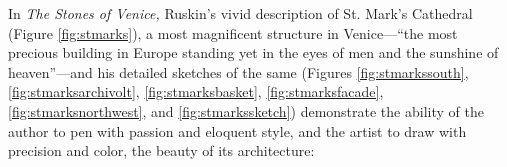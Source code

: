 In \textit{The Stones of Venice,} Ruskin’s vivid description of St.
Mark’s Cathedral (Figure \ref{fig:stmarks}), a most magnificent structure in Venice---“the
most precious building in Europe standing yet in the eyes of men and
the sunshine of heaven”\citep{nyt1880}---and his detailed sketches of the
same (Figures \ref{fig:stmarkssouth}, \ref{fig:stmarksarchivolt}, \ref{fig:stmarksbasket}, \ref{fig:stmarksfacade}, \ref{fig:stmarksnorthwest}, and \ref{fig:stmarkssketch}) demonstrate the ability of the author to pen with
passion and eloquent style, and the artist to draw with precision and
color, the beauty of its architecture: 




